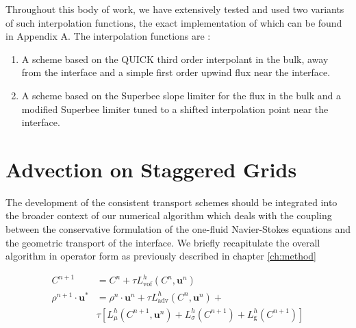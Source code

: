 Throughout this body of work, we have extensively tested and used 
two variants of such interpolation functions, the exact implementation 
of which can be found in Appendix A. The interpolation functions are :



\begin{enumerate}
\item A scheme based on the QUICK 
third order interpolant in the bulk, away from the interface 
and a simple first order upwind flux near the interface. 
\item A scheme based on the Superbee slope limiter  for the flux in the 
bulk and a modified Superbee limiter tuned to a shifted interpolation point near the 
interface.  
\end{enumerate}





\section{Advection on Staggered Grids}

The development of the consistent transport schemes should be integrated into
the broader context of our numerical algorithm which deals with the 
coupling between the conservative formulation of the 
one-fluid Navier-Stokes equations and the geometric transport of the interface.  
We briefly recapitulate the overall algorithm in operator form as previously described in 
chapter \ref{ch:method}




\begin{align}
	C^{n+1} &= C^{n} + \tau L^{h}_{\textrm{vof}}\left( C^{n},\boldsymbol{u}^{n}\right) \\  
	\rho^{n+1}\cdot \boldsymbol{u}^{*} &= \rho^{n}\cdot \boldsymbol{u}^{n} + \tau L^{h}_{\textrm{adv}}\left( C^{n},\boldsymbol{u}^{n} \right) + \nonumber \\
				      & \tau \left[ L^{h}_{\mu}\left(C^{n+1},\boldsymbol{u}^{n}\right) + L^{h}_{\sigma}\left(C^{n+1}\right) + L^{h}_{\textrm{g}}\left(C^{n+1}\right)\right]
\label{global_eqns}
\end{align}


